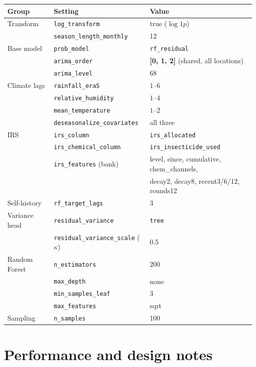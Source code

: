 \documentclass[11pt]{article}
\newcommand{\code}[1]{\texttt{\small #1}}
\begin{document}
\begin{center}
\small
\begin{tabular}{@{}lll@{}}
\toprule
Group & Setting & Value \\
\midrule
Transform & \code{log\_transform} & true ($\log1p$) \\
          & \code{season\_length\_monthly} & 12 \\
Base model & \code{prob\_model} & \code{rf\_residual} \\
           & \code{arima\_order} & \textbf{[0, 1, 2]} (shared, all locations) \\
           & \code{arima\_level} & 68 \\
Climate lags & \code{rainfall\_era5} & $1$--$6$ \\
             & \code{relative\_humidity} & $1$--$4$ \\
             & \code{mean\_temperature} & $1$--$2$ \\
             & \code{deseasonalize\_covariates} & all three \\
IRS & \code{irs\_column} & \code{irs\_allocated} \\
    & \code{irs\_chemical\_column} & \code{irs\_insecticide\_used} \\
    & \code{irs\_features} (bank) & level, since, cumulative, chem\_channels, \\
    & & decay2, decay8, recent3/6/12, rounds12 \\
Self-history & \code{rf\_target\_lags} & 3 \\
Variance head & \code{residual\_variance} & \code{tree} \\
              & \code{residual\_variance\_scale} ($\kappa$) & 0.5 \\
Random Forest & \code{n\_estimators} & 200 \\
              & \code{max\_depth} & none \\
              & \code{min\_samples\_leaf} & 3 \\
              & \code{max\_features} & sqrt \\
Sampling & \code{n\_samples} & 100 \\
\bottomrule
\end{tabular}
\end{center}

\section{Performance and design notes}
\end{document}
